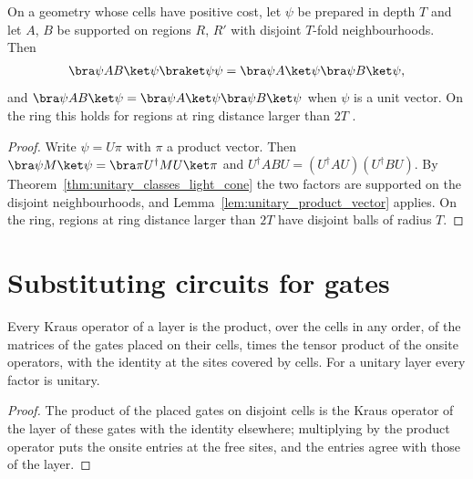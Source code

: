 \begin{theorem}
    \label{thm:unitary_correlations}
    \leanok
    On a geometry whose cells have positive cost, let $\psi$ be prepared in depth $T$
    and let $A$, $B$ be supported on regions $R$, $R'$ with disjoint $T$-fold
    neighbourhoods. Then
    \begin{align}
        \bra\psi AB\ket\psi\braket\psi\psi=\bra\psi A\ket\psi\bra\psi B\ket\psi,
        \notag
    \end{align}
    and $\bra\psi AB\ket\psi=\bra\psi A\ket\psi\bra\psi B\ket\psi$ when $\psi$ is a unit
    vector. On the ring this holds for regions at ring distance larger than $2T$
    \cite[Supplemental Material, proof of Theorem~1]{Malz2024Preparation}.
\end{theorem}
\begin{proof}\leanok
    Write $\psi=U\pi$ with $\pi$ a product vector. Then
    $\bra\psi M\ket\psi=\bra\pi U^\dagger MU\ket\pi$ and
    $U^\dagger ABU=(U^\dagger AU)(U^\dagger BU)$. By
    Theorem~\ref{thm:unitary_classes_light_cone} the two factors are supported on the
    disjoint neighbourhoods, and Lemma~\ref{lem:unitary_product_vector} applies. On the
    ring, regions at ring distance larger than $2T$ have disjoint balls of radius $T$.
\end{proof}

\section{Substituting circuits for gates}
\label{sec:unitary_substitution}

\begin{lemma}
    \label{lem:unitary_layer_factorization}
    \leanok
    Every Kraus operator of a layer is the product, over the cells in any order, of the
    matrices of the gates placed on their cells, times the tensor product of the onsite
    operators, with the identity at the sites covered by cells. For a unitary layer every
    factor is unitary.
\end{lemma}
\begin{proof}\leanok
    The product of the placed gates on disjoint cells is the Kraus operator of the layer of
    these gates with the identity elsewhere; multiplying by the product operator puts the
    onsite entries at the free sites, and the entries agree with those of the layer.
\end{proof}

